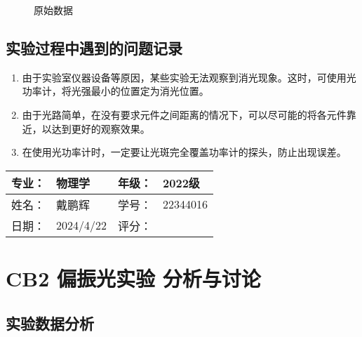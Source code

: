 \documentclass[dvipsnames, svgnames,a4paper,11pt]{article}
\begin{document}
	\begin{figure}[htbp]
		\centering
		\quad
		\quad
		\quad
		\quad

		\caption{原始数据}
		\label{fig:data}
	\end{figure}



\subsection{实验过程中遇到的问题记录}

\begin{enumerate}
	\item 由于实验室仪器设备等原因，某些实验无法观察到消光现象。这时，可使用光功率计，将光强最小的位置定为消光位置。
	\item 由于光路简单，在没有要求元件之间距离的情况下，可以尽可能的将各元件靠近，以达到更好的观察效果。
	\item 在使用光功率计时，一定要让光斑完全覆盖功率计的探头，防止出现误差。
	
\end{enumerate}
	

\clearpage
\begin{table}
	\renewcommand\arraystretch{1.7}
	\begin{tabularx}{\textwidth}{|X|X|X|X|}
	\hline
	专业：& 物理学 &年级：& 2022级\\
	\hline
	姓名： & 戴鹏辉 & 学号：& 22344016\\
	\hline
    日期：& 2024/4/22 & 评分： &\\
	\hline
	\end{tabularx}
\end{table}

\section{CB2 \quad 偏振光实验 \quad\heiti 分析与讨论}

\subsection{实验数据分析}
\end{document}
